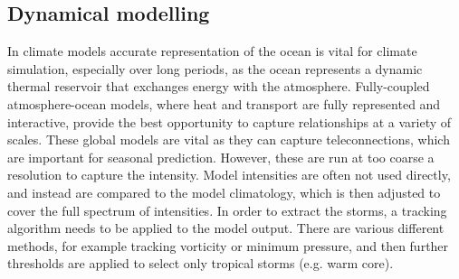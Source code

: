 





\subsection{Dynamical modelling}

In climate models accurate representation of the ocean is vital for climate simulation, especially over long periods, as the ocean represents a dynamic thermal reservoir that exchanges energy with the atmosphere. Fully-coupled atmosphere-ocean models, where heat and transport are fully represented and interactive, provide the best opportunity to capture relationships at a variety of scales.  These global models are vital as they can capture teleconnections, which are important for seasonal prediction. However, these are run at too coarse a resolution to capture the intensity. Model intensities are often not used directly, and instead are compared to the model climatology, which is then adjusted to cover the full spectrum of intensities. In order to extract the storms, a tracking algorithm needs to be applied to the model output. There are various different methods, for example tracking vorticity or minimum pressure, and then further thresholds are applied to select only tropical storms (e.g. warm core). %


